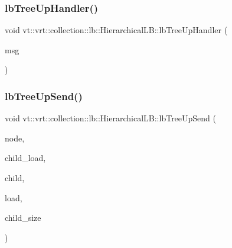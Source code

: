 \mbox{\label{structvt_1_1vrt_1_1collection_1_1lb_1_1_hierarchical_l_b_a3b67d27c10a6a7532c9c5d1a57ab722a}} 
\subsubsection{\texorpdfstring{lb\+Tree\+Up\+Handler()}{lbTreeUpHandler()}}
{\footnotesize\ttfamily void vt\+::vrt\+::collection\+::lb\+::\+Hierarchical\+L\+B\+::lb\+Tree\+Up\+Handler (\begin{DoxyParamCaption}\item[{\hyperlink{structvt_1_1vrt_1_1collection_1_1lb_1_1_l_b_tree_up_msg}{L\+B\+Tree\+Up\+Msg} $\ast$}]{msg }\end{DoxyParamCaption})\hspace{0.3cm}{\ttfamily [private]}}

\mbox{\label{structvt_1_1vrt_1_1collection_1_1lb_1_1_hierarchical_l_b_a8a9d35f8b4a8cd21461209136e64ad30}} 
\subsubsection{\texorpdfstring{lb\+Tree\+Up\+Send()}{lbTreeUpSend()}}
{\footnotesize\ttfamily void vt\+::vrt\+::collection\+::lb\+::\+Hierarchical\+L\+B\+::lb\+Tree\+Up\+Send (\begin{DoxyParamCaption}\item[{\hyperlink{namespacevt_a866da9d0efc19c0a1ce79e9e492f47e2}{Node\+Type} const}]{node,  }\item[{\hyperlink{structvt_1_1vrt_1_1collection_1_1lb_1_1_base_l_b_a215e22b9f12678303f49615ae3be05cc}{Load\+Type} const}]{child\+\_\+load,  }\item[{\hyperlink{namespacevt_a866da9d0efc19c0a1ce79e9e492f47e2}{Node\+Type} const}]{child,  }\item[{\hyperlink{structvt_1_1vrt_1_1collection_1_1lb_1_1_load_sampler_base_l_b_a8d939a849ec0d6371c1c4d441ffb9b94}{Obj\+Sample\+Type} const \&}]{load,  }\item[{\hyperlink{namespacevt_a866da9d0efc19c0a1ce79e9e492f47e2}{Node\+Type} const}]{child\+\_\+size }\end{DoxyParamCaption})\hspace{0.3cm}{\ttfamily [private]}}

